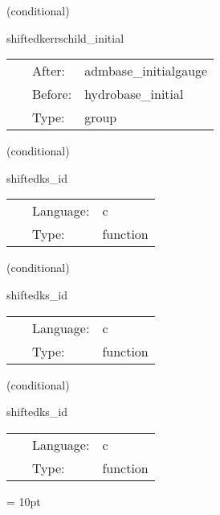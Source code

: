    (conditional) 

\hspace{5mm} shiftedkerrschild\_initial 

\hspace{5mm}{\it schedule shiftedkerrschild initial data group } 


\hspace{5mm}

 \begin{tabular*}{160mm}{cll} 
~ & After:  & admbase\_initialgauge \\ 
~ & Before:  & hydrobase\_initial \\ 
~ & Type:  & group \\ 
\end{tabular*} 


\vspace{5mm}

   (conditional) 

\hspace{5mm} shiftedks\_id 

\hspace{5mm}{\it set up shifted kerr-schild initial data } 


\hspace{5mm}

 \begin{tabular*}{160mm}{cll} 
~ & Language:  & c \\ 
~ & Type:  & function \\ 
\end{tabular*} 


\vspace{5mm}

   (conditional) 

\hspace{5mm} shiftedks\_id 

\hspace{5mm}{\it set up shifted kerr-schild initial data } 


\hspace{5mm}

 \begin{tabular*}{160mm}{cll} 
~ & Language:  & c \\ 
~ & Type:  & function \\ 
\end{tabular*} 


\vspace{5mm}

   (conditional) 

\hspace{5mm} shiftedks\_id 

\hspace{5mm}{\it set up shifted kerr-schild initial data } 


\hspace{5mm}

 \begin{tabular*}{160mm}{cll} 
~ & Language:  & c \\ 
~ & Type:  & function \\ 
\end{tabular*} 



\vspace{5mm}\parskip = 10pt 

